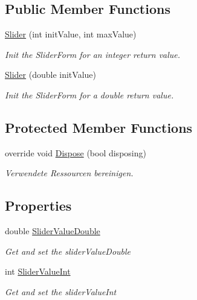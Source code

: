 \subsection*{Public Member Functions}
\begin{DoxyCompactItemize}
\item 
\hyperlink{class_a_rdev_kit_1_1_view_1_1_slider_a9bb16b6a8e70e9e8530d7df8991afcd5}{Slider} (int init\-Value, int max\-Value)
\begin{DoxyCompactList}\small\item\em Init the Slider\-Form for an integer return value. \end{DoxyCompactList}\item 
\hyperlink{class_a_rdev_kit_1_1_view_1_1_slider_af40e3fca8a9d64029b5cd9b94077eb11}{Slider} (double init\-Value)
\begin{DoxyCompactList}\small\item\em Init the Slider\-Form for a double return value. \end{DoxyCompactList}\end{DoxyCompactItemize}
\subsection*{Protected Member Functions}
\begin{DoxyCompactItemize}
\item 
override void \hyperlink{class_a_rdev_kit_1_1_view_1_1_slider_ac051ee212a71f40c9e313d46f4d1f209}{Dispose} (bool disposing)
\begin{DoxyCompactList}\small\item\em Verwendete Ressourcen bereinigen. \end{DoxyCompactList}\end{DoxyCompactItemize}
\subsection*{Properties}
\begin{DoxyCompactItemize}
\item 
double \hyperlink{class_a_rdev_kit_1_1_view_1_1_slider_a4992b4f44df519d4490004030c720d8f}{Slider\-Value\-Double}
\begin{DoxyCompactList}\small\item\em Get and set the slider\-Value\-Double \end{DoxyCompactList}\item 
int \hyperlink{class_a_rdev_kit_1_1_view_1_1_slider_a3405af3a2d8c39d5e018899859768da5}{Slider\-Value\-Int}
\begin{DoxyCompactList}\small\item\em Get and set the slider\-Value\-Int \end{DoxyCompactList}\end{DoxyCompactItemize}


